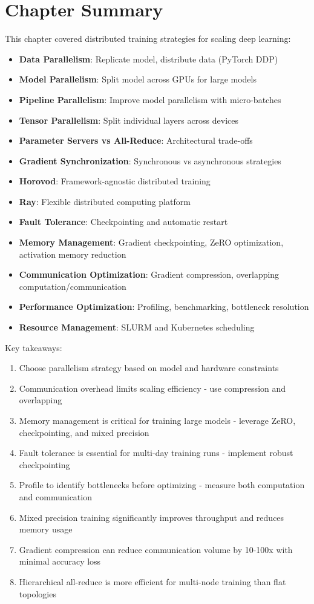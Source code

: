 \section{Chapter Summary}

This chapter covered distributed training strategies for scaling deep learning:

\begin{itemize}
    \item \textbf{Data Parallelism}: Replicate model, distribute data (PyTorch DDP)
    \item \textbf{Model Parallelism}: Split model across GPUs for large models
    \item \textbf{Pipeline Parallelism}: Improve model parallelism with micro-batches
    \item \textbf{Tensor Parallelism}: Split individual layers across devices
    \item \textbf{Parameter Servers vs All-Reduce}: Architectural trade-offs
    \item \textbf{Gradient Synchronization}: Synchronous vs asynchronous strategies
    \item \textbf{Horovod}: Framework-agnostic distributed training
    \item \textbf{Ray}: Flexible distributed computing platform
    \item \textbf{Fault Tolerance}: Checkpointing and automatic restart
    \item \textbf{Memory Management}: Gradient checkpointing, ZeRO optimization, activation memory reduction
    \item \textbf{Communication Optimization}: Gradient compression, overlapping computation/communication
    \item \textbf{Performance Optimization}: Profiling, benchmarking, bottleneck resolution
    \item \textbf{Resource Management}: SLURM and Kubernetes scheduling
\end{itemize}

Key takeaways:
\begin{enumerate}
    \item Choose parallelism strategy based on model and hardware constraints
    \item Communication overhead limits scaling efficiency - use compression and overlapping
    \item Memory management is critical for training large models - leverage ZeRO, checkpointing, and mixed precision
    \item Fault tolerance is essential for multi-day training runs - implement robust checkpointing
    \item Profile to identify bottlenecks before optimizing - measure both computation and communication
    \item Mixed precision training significantly improves throughput and reduces memory usage
    \item Gradient compression can reduce communication volume by 10-100x with minimal accuracy loss
    \item Hierarchical all-reduce is more efficient for multi-node training than flat topologies
\end{enumerate}

